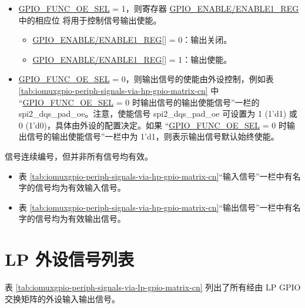 \documentclass[main\_\_CN.tex]{subfiles}
\begin{document}
\begin{itemize}
    \item \hyperref[fielddesc:GPIOFUNCNOESEL]{GPIO\_FUNC\_OE\_SEL} = 1，则寄存器 \hyperref[regdesc:GPIOENABLEREG]{GPIO\_ENABLE/ENABLE1\_REG} 中的相应位   将用于控制信号输出使能。

    \begin{itemize}
        \item \hyperref[regdesc:GPIOENABLEREG]{GPIO\_ENABLE/ENABLE1\_REG}[] = 0：输出关闭。
        \item \hyperref[regdesc:GPIOENABLEREG]{GPIO\_ENABLE/ENABLE1\_REG}[] = 1：输出使能。
    \end{itemize}
    \item \hyperref[fielddesc:GPIOFUNCNOESEL]{GPIO\_FUNC\_OE\_SEL} = 0，则输出信号的使能由外设控制，例如表 \ref{tab:iomuxgpio-periph-signals-via-hp-gpio-matrix-cn} 中 “\hyperref[fielddesc:GPIOFUNCNOESEL]{GPIO\_FUNC\_OE\_SEL} = 0 时输出信号的输出使能信号”一栏的 spi2\_dqs\_pad\_oe。注意，使能信号 spi2\_dqs\_pad\_oe 可设置为 1 (1'd1) 或 0 (1'd0)，具体由外设的配置决定。如果 “\hyperref[fielddesc:GPIOFUNCNOESEL]{GPIO\_FUNC\_OE\_SEL} = 0 时输出信号的输出使能信号”一栏中为 1'd1，则表示输出信号默认始终使能。
\end{itemize}

\begin{tiplisting}
信号连续编号，但并非所有信号均有效。
\vspace{-1em}
\begin{itemize}
    \item 表 \ref{tab:iomuxgpio-periph-signals-via-hp-gpio-matrix-cn}“输入信号”一栏中有名字的信号均为有效输入信号。
    \item 表 \ref{tab:iomuxgpio-periph-signals-via-hp-gpio-matrix-cn}“输出信号”一栏中有名字的信号均为有效输出信号。
\end{itemize}
\end{tiplisting}

\begin{landscape}


\tableheaderHPSignalCN
\tablecontentHPSignal

\end{landscape}

\section{LP 外设信号列表}
\label{sec:lp_peripheral_signals}
表 \ref{tab:iomuxgpio-periph-signals-via-lp-gpio-matrix-cn} 列出了所有经由 LP GPIO 交换矩阵的外设输入输出信号。
\end{document}
